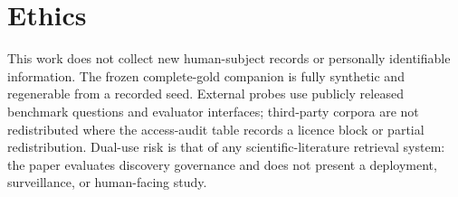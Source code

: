 \section{Ethics}
\label{sec:ethics}

This work does not collect new human-subject records or personally identifiable
information.  The frozen complete-gold companion is fully synthetic and
regenerable from a recorded seed.  External probes use publicly released
benchmark questions and evaluator interfaces; third-party corpora are not
redistributed where the access-audit table records a licence block or partial
redistribution.  Dual-use risk is that of any scientific-literature retrieval
system: the paper evaluates discovery governance and does not present a
deployment, surveillance, or human-facing study.
